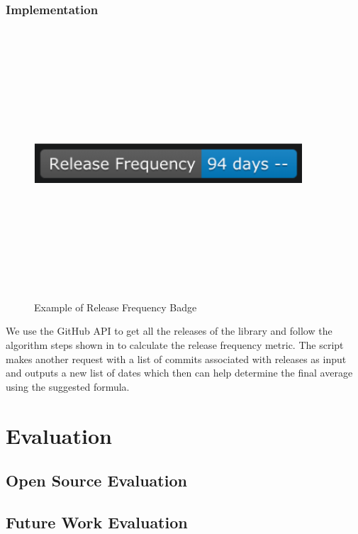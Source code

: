 \documentclass[12pt, letterpaper]{article}
\begin{document}
\subsubsection{Implementation}

\begin{figure}[!htb]
    \centerline{
        \includegraphics[width=10cm,height=10cm,keepaspectratio=true]{releasebadge}
    }
    \caption{
        Example of Release Frequency Badge
    }
    \label{releasebadge}
\end{figure}

We use the GitHub \cite{github} API to get all the releases of the library and follow the algorithm
steps shown in \cite{metrics} to calculate the release frequency metric.
The script makes another request with a list of commits associated with releases as input
and outputs a new list of dates which then can help determine the final average using the suggested
formula.




\section{Evaluation}

\subsection{Open Source Evaluation}
\subsection{Future Work Evaluation}
\end{document}
